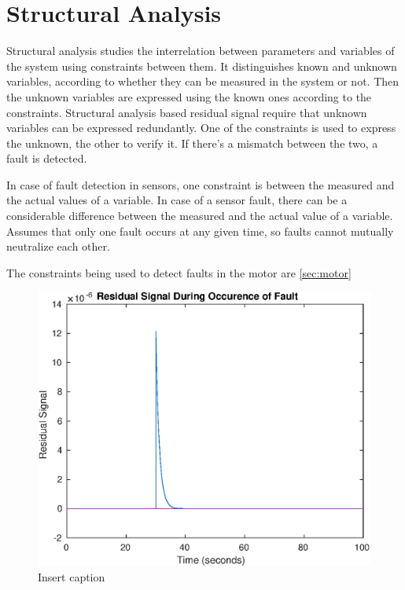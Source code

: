 \section{Structural Analysis}

\label{sec:structural}

Structural analysis studies the interrelation between parameters and variables of the system using constraints between them. It distinguishes known and unknown variables, according to whether they can be measured in the system or not. Then the unknown variables are expressed using the known ones according to the constraints. Structural analysis based residual signal require that unknown variables can be expressed redundantly. One of the constraints is used to express the unknown, the other to verify it. If there's a mismatch between the two, a fault is detected.

In case of fault detection in sensors, one constraint is between the measured and the actual values of a variable. In case of a sensor fault, there can be a considerable difference between the measured and the actual value of a variable. Assumes that only one fault occurs at any given time, so faults cannot mutually neutralize each other. 

The constraints being used to detect faults in the motor are \ref{sec:motor} 

\begin{figure}
	\centering
	\includegraphics[width=120mm]{figures/residual}
	\caption{Insert caption}
	\label{fig:residual}
\end{figure} 


